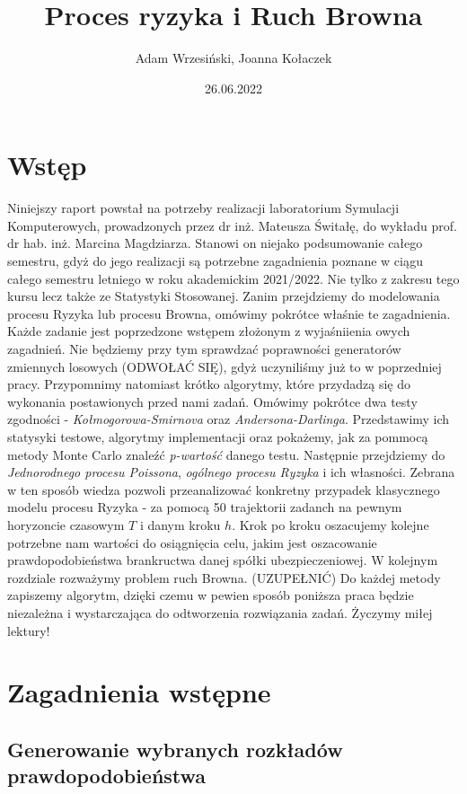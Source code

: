 \documentclass{article}
\title{Proces ryzyka i Ruch Browna}
\author{Adam Wrzesiński, Joanna Kołaczek}
\date{26.06.2022}
\theoremstyle{break}
\numberwithin{equation}{subsection}
\numberwithin{figure}{section}
\begin{document}
\maketitle
\tableofcontents
\newpage
\section*{Wstęp}

Niniejszy raport powstał na potrzeby realizacji laboratorium Symulacji Komputerowych, prowadzonych przez dr inż. Mateusza Świtałę, do wykładu prof. dr hab. inż. Marcina Magdziarza. Stanowi on niejako podsumowanie całego semestru, gdyż do jego realizacji są potrzebne zagadnienia poznane w ciągu całego semestru letniego w roku akademickim 2021/2022. Nie tylko z zakresu tego kursu
lecz także ze Statystyki Stosowanej. Zanim przejdziemy do modelowania procesu Ryzyka lub procesu Browna, omówimy pokrótce właśnie te zagadnienia. Każde zadanie jest poprzedzone wstępem złożonym z wyjaśniienia owych zagadnień. Nie będziemy przy tym sprawdzać poprawności generatorów zmiennych losowych (ODWOŁAĆ SIĘ), gdyż uczyniliśmy już to w poprzedniej pracy.
Przypomnimy natomiast krótko algorytmy, które przydadzą się do wykonania postawionych przed nami zadań. Omówimy pokrótce dwa testy zgodności - \emph{Kołmogorowa-Smirnova} oraz \emph{Andersona-Darlinga}. Przedstawimy ich statysyki testowe, algorytmy implementacji oraz pokażemy, jak za pommocą metody Monte Carlo znaleźć \emph{p-wartość} danego testu.
Następnie przejdziemy do \emph{Jednorodnego procesu Poissona}, \emph{ogólnego procesu Ryzyka} i ich własności. Zebrana w ten sposób wiedza pozwoli przeanalizować konkretny przypadek klasycznego modelu procesu Ryzyka - za pomocą 50 trajektorii zadanch na pewnym horyzoncie czasowym $T$  i danym kroku $h$. Krok po kroku oszacujemy kolejne potrzebne nam wartości do osiągnięcia celu, jakim jest oszacowanie prawdopodobieństwa brankructwa danej spółki ubezpieczeniowej. W kolejnym rozdziale rozważymy problem ruch Browna. (UZUPEŁNIĆ)
Do każdej metody zapiszemy algorytm, dzięki czemu w pewien sposób poniższa praca będzie niezależna i wystarczająca do odtworzenia rozwiązania zadań. Życzymy miłej lektury!

\newpage

\section{Zagadnienia wstępne}

\subsection{Generowanie wybranych rozkładów prawdopodobieństwa}
\end{document}
